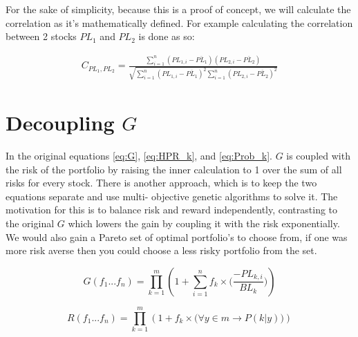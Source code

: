 \documentclass[11pt]{article}
\begin{document}
    For the sake of simplicity, because this is a proof of concept, we will calculate the
    correlation as it's mathematically defined.
    For example calculating the correlation between 2 stocks \(PL_1\) and \(PL_2\) is
    done as so:

    \begin{align}
        C_{PL_1, PL_2} = 
        \frac{
            \displaystyle\sum^{n}_{i=1} (PL_{1, i} - \overline {PL_1})(PL_{2, i} - \overline {PL_2})
        }{
            \sqrt{
                \displaystyle\sum^{n}_{i=1}(PL_{1,i} - \overline {PL_1})^2 
                \displaystyle\sum^{n}_{i=1}(PL_{2,i} - \overline {PL_2})^2
            }
        }
        \label{eq:Correlation}
    \end{align}

\section{Decoupling \(G\)} \label{section:DecoupleG}

    In the original equations \ref{eq:G}, \ref{eq:HPR_k}, and \ref{eq:Prob_k}.
    \(G\) is coupled with the risk of the portfolio
    by raising the inner calculation to 1 over the sum of all risks for every stock.
    There is another approach, which is to keep the two equations separate and use multi-
    objective genetic algorithms to solve it. The motivation for this is to balance risk
    and reward independently, contrasting to the original \(G\) which lowers the gain
    by coupling it with the risk exponentially. We would also gain a Pareto set of
    optimal portfolio's to choose from, if one was more risk averse then you could choose
    a less risky portfolio from the set.

    \begin{equation}\label{eq:DecoupleG}
        G(f_1...f_n) = \displaystyle\prod^{m}_{k=1} \left(
                1 + \displaystyle\sum^{n}_{i=1} f_k \times \Big(
                    \frac{- PL_{k,i} }{BL_k}
                \Big)
            \right)
    \end{equation}

    \begin{equation}\label{eq:DecoupleR}
        R(f_1...f_n) = \displaystyle\prod^{m}_{k=1} \left(
                1 + f_k \times \Big(
                    \forall y \in m \to P(k|y)
                \Big)
            \right)
    \end{equation}
\end{document}
